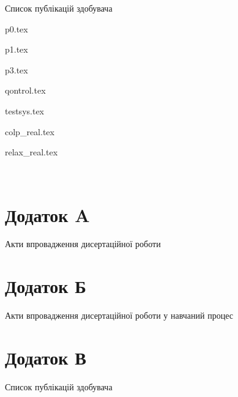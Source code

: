 \documentclass[13pt,d,ukrlang]{vakthesisatu}
\author{\dissauthorFullRu}
\title{\booknameRu}
\date{\bookyear}
\begin{document}






\medskip

\begin{center}
Список публікацій здобувача
\end{center}



\clearpage
{}
{}
\tableofcontents




{p0.tex} %

{p1.tex} %


{p3.tex} %

{qontrol.tex} %

{testsys.tex} %

{colp_real.tex} %

{relax_real.tex} %






\clearpage
{}

\printbibliography[sorting=nty,title=СПИСОК ВИКОРИСТАНИХ ДЖЕРЕЛ]
\label{e:atu}{~}

\clearpage
{}
\chapter*{Додаток A}

\vspace{-7ex}
\begin{center}
Акти впровадження дисертаційної роботи
\end{center}


\clearpage
{}
\chapter*{Додаток Б}

\vspace{-7ex}
\begin{center}
Акти впровадження дисертаційної роботи у навчаний процес
\end{center}


\clearpage
{}
\chapter*{Додаток В}

\vspace{-7ex}
\begin{center}
  Список публікацій здобувача
\end{center}


\end{document}
